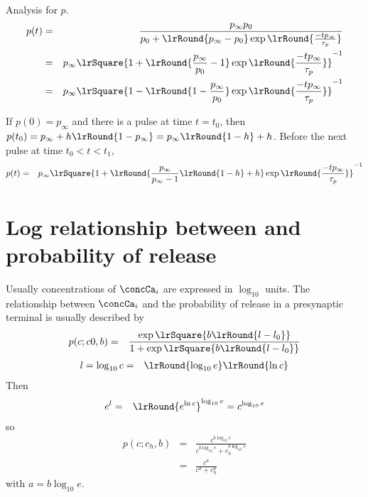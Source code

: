 \documentclass[10pt]{article}
\begin{document}
Analysis for $p$. 
\begin{eqnarray}
p (t) 
&=& \frac{p_{\infty} p_0}{p_0 + \lrRound{p_{\infty} - p_0} \exp
  \lrRound{\frac{ -t p_{\infty} }{\tau_p}} } 
\\
&=& {p_{\infty} }\lrSquare{1 + \lrRound{\frac{p_{\infty} }{p_0} -1} \exp
  \lrRound{\frac{ -t p_{\infty} }{\tau_p}} } ^{-1}
\\
&=& {p_{\infty} }\lrSquare{1 - \lrRound{1- \frac{p_{\infty} }{p_0} } \exp
  \lrRound{\frac{ -t p_{\infty} }{\tau_p}} } ^{-1}
\end{eqnarray}

If $p(0)=p_{\infty}$ and there is a pulse at time $t=t_0$, then
$p(t_0)=p_{\infty} + h \lrRound{1-p_{\infty}} 
= p_{\infty}\lrRound{1-h} + h$. Before the next pulse at time $t_0<t<t_1$, 
\begin{eqnarray}
p (t) &=& {p_{\infty} }\lrSquare{1 + \lrRound{\frac{p_{\infty} }{p_{\infty} -1} \lrRound{1-h} + h} \exp
  \lrRound{\frac{ -t p_{\infty} }{\tau_p}} } ^{-1}
\end{eqnarray}



\section{Log relationship between {\calcium} and probability of release}

Usually concentrations of $\concCa_i$ are expressed in $\log_{10}$ units.  The relationship between ${\concCa_i}$ and the probability of release in a presynaptic terminal is usually described by
\begin{eqnarray*}
p(c; c0, b) &=& \frac{\exp\lrSquare{b \lrRound{l-l_0}}}{1+\exp\lrSquare{b \lrRound{l-l_0}}}
\end{eqnarray*}
\begin{eqnarray*}
l= \log_{10} c &=& \lrRound{\log_{10} e }\lrRound{\ln c }
\end{eqnarray*}
Then 
\begin{eqnarray*}
e^l &=& \lrRound{e^{\ln c  }}^ {\log_{10} e  }
= c^{ \log_{10} e } 
\end{eqnarray*}
so
\begin{eqnarray*}
p(c; c_h, b) 
&=& \frac{c^{ b \log_{10} e } }{c^{ b \log_{10} e }+c_h^{ b \log_{10} e }}
\\
&=& \frac{c^{a} }{c^{a}+c_h^{a}}
\end{eqnarray*}
with $a=b \log_{10} e$.



\end{document}
